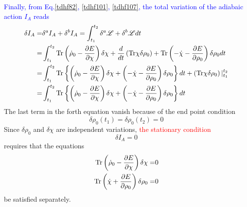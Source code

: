   \textcolor{blue}{Finally, from Eq.\eqref{tdhf82}, \eqref{tdhf101}, \eqref{tdhf107}, the total variation of the adiabaic action $I_A$ reads}
  \begin{equation}
    \begin{aligned}
      \delta I_A =& \delta^a I_A + \delta^b I_A = \int_{t_1}^{t_2} \delta^a\mathscr{L} + \delta^b\mathscr{L} dt\\
      =& \int_{t_1}^{t_2} {\rm Tr}\left(\dot{\rho}_0 - \frac{\partial E}{\partial\chi}\right)\delta\chi + \frac{d}{dt}\left({\rm Tr}\chi\delta\rho_0\right) + {\rm Tr}\left( -\dot{\chi} - \frac{\partial E}{\partial\rho_0} \right)\delta\rho_0  dt \\
      =& \int_{t_1}^{t_2} {\rm Tr}\left\{\left(\dot{\rho}_0 - \frac{\partial E}{\partial\chi}\right)\delta\chi + \left( -\dot{\chi} - \frac{\partial E}{\partial\rho_0} \right)\delta\rho_0 \right\}  dt  + \left({\rm Tr}\chi\delta\rho_0\right)|_{t_1}^{t_2}\\
      =& \int_{t_1}^{t_2} {\rm Tr}\left\{\left(\dot{\rho}_0 - \frac{\partial E}{\partial\chi}\right)\delta\chi + \left( -\dot{\chi} - \frac{\partial E}{\partial\rho_0} \right)\delta\rho_0 \right\}  dt
    \end{aligned}
  \end{equation}
  The last term in the forth equation vanish because of the end point condition
  \begin{equation}
    \delta\rho_0(t_1) = \delta\rho_0(t_2) = 0
  \end{equation}
  Since $\delta\rho_0$ and $\delta\chi$ are independent variations, \textcolor{red}{the stationary condition}
  \begin{equation}
    \delta I_A = 0
  \end{equation}
  requires that the equations
  \begin{equation}
    \begin{aligned}
      {\rm Tr}\left(\dot{\rho}_0 - \frac{\partial E}{\partial\chi}\right)\delta\chi =& 0\\  \label{tdhf112}
      {\rm Tr}\left( \dot{\chi} + \frac{\partial E}{\partial\rho_0} \right)\delta\rho_0 =& 0
    \end{aligned}
  \end{equation}
  be satisfied separately.


